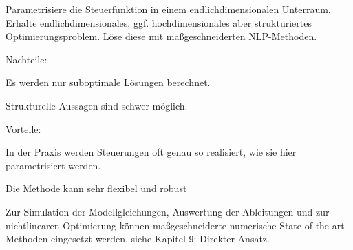 
Parametrisiere die Steuerfunktion in einem endlichdimensionalen Unterraum. Erhalte endlichdimensionales, ggf. hochdimensionales aber strukturiertes Optimierungsproblem. Löse diese mit maßgeschneiderten NLP-Methoden.

Nachteile:

\bitm
\item Es werden nur suboptimale Lösungen berechnet.
\item Strukturelle Aussagen sind schwer möglich.
\eitm

Vorteile:

\bitm
\item In der Praxis werden Steuerungen oft genau so realisiert, wie sie hier parametrisiert werden.
\item Die Methode kann sehr flexibel und robust 
\item Zur Simulation der Modellgleichungen, Auswertung der Ableitungen und zur nichtlinearen Optimierung können maßgeschneiderte numerische State-of-the-art-Methoden eingesetzt werden, siehe Kapitel 9: Direkter Ansatz.
\eitm

